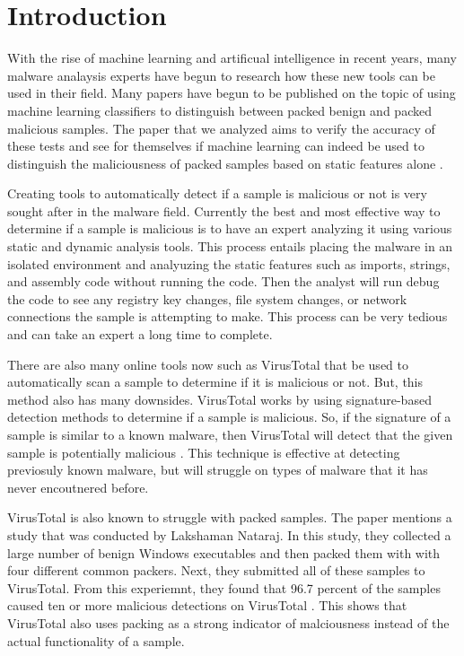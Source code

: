 \section{Introduction}
\label{sec:intro}

With the rise of machine learning and artificual intelligence in recent years, many malware analaysis experts have begun to research how these new tools can be used in their field. Many papers have begun to be published on the topic of using machine learning classifiers to distinguish between packed benign and packed malicious samples. The paper that we analyzed aims to verify the accuracy of these tests and see for themselves if machine learning can indeed be used to distinguish the maliciousness of packed samples based on static features alone \cite{Aghakhani2020}. 

Creating tools to automatically detect if a sample is malicious or not is very sought after in the malware field. Currently the best and most effective way to determine if a sample is malicious is to have an expert analyzing it using various static and dynamic analysis tools. This process entails placing the malware in an isolated environment and analyuzing the static features such as imports, strings, and assembly code without running the code. Then the analyst will run debug the code to see any registry key changes, file system changes, or network connections the sample is attempting to make. This process can be very tedious and can take an expert a long time to complete.

There are also many online tools now such as VirusTotal that be used to automatically scan a sample to determine if it is malicious or not. But, this method also has many downsides. VirusTotal works by using signature-based detection methods to determine if a sample is malicious. So, if the signature of a sample is similar to a known malware, then VirusTotal will detect that the given sample is potentially malicious \cite{Aghakhani2020}. This technique is effective at detecting previosuly known malware, but will struggle on types of malware that it has never encoutnered before. 

VirusTotal is also known to struggle with packed samples. The paper mentions a study that was conducted by Lakshaman Nataraj. In this study, they collected a large number of benign Windows executables and then packed them with with four different common packers. Next, they submitted all of these samples to VirusTotal. From this experiemnt, they found that 96.7 percent of the samples caused ten or more malicious detections on VirusTotal \cite{Aghakhani2020}. This shows that VirusTotal also uses packing as a strong indicator of malciousness instead of the actual functionality of a sample. 

